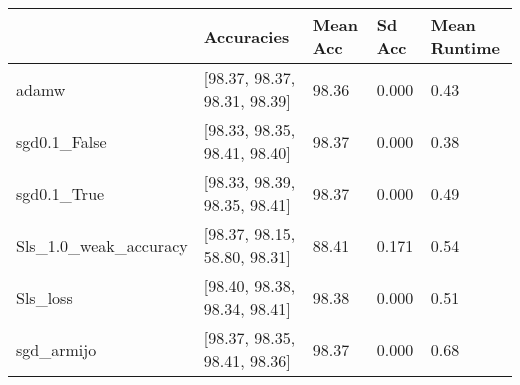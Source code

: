 \begin{tabular}{lllll}
\toprule
{} &                    Accuracies & Mean Acc & Sd Acc & Mean Runtime \\
\midrule
adamw                 &  [98.37, 98.37, 98.31, 98.39] &    98.36 &  0.000 &         0.43 \\
sgd0.1\_False          &  [98.33, 98.35, 98.41, 98.40] &    98.37 &  0.000 &         0.38 \\
sgd0.1\_True           &  [98.33, 98.39, 98.35, 98.41] &    98.37 &  0.000 &         0.49 \\
Sls\_1.0\_weak\_accuracy &  [98.37, 98.15, 58.80, 98.31] &    88.41 &  0.171 &         0.54 \\
Sls\_loss              &  [98.40, 98.38, 98.34, 98.41] &    98.38 &  0.000 &         0.51 \\
sgd\_armijo            &  [98.37, 98.35, 98.41, 98.36] &    98.37 &  0.000 &         0.68 \\
\bottomrule
\end{tabular}
